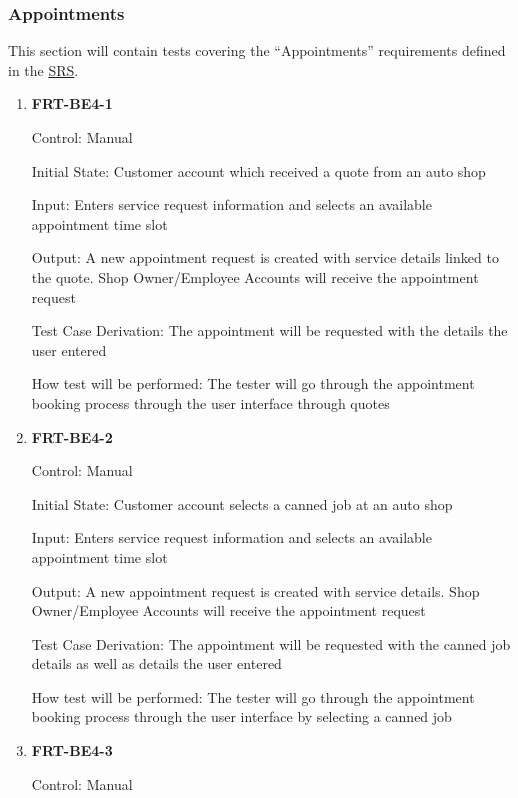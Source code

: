 \documentclass[12pt, titlepage]{article}
\begin{document}
\subsubsection{Appointments}

This section will contain tests covering the ``Appointments'' requirements defined in the
\href{https://github.com/arkinmodi/project-sayyara/blob/main/docs/SRS/SRS.pdf}{SRS}.

\begin{enumerate}

	\item \textbf{FRT-BE4-1}

	      Control: Manual

	      Initial State: Customer account which received a quote from an auto shop

	      Input: Enters service request information and selects an available appointment time slot

	      Output: A new appointment request is created with service details linked to the quote. Shop
	      Owner/Employee Accounts will receive the appointment request

	      Test Case Derivation: The appointment will be requested with the details the user entered

	      How test will be performed: The tester will go through the appointment booking process through the
	      user interface through quotes

	\item \textbf{FRT-BE4-2}

	      Control: Manual

	      Initial State: Customer account selects a canned job at an auto shop

	      Input: Enters service request information and selects an available appointment time slot

	      Output: A new appointment request is created with service details. Shop Owner/Employee Accounts
	      will receive the appointment request

	      Test Case Derivation: The appointment will be requested with the canned job details as well as
	      details the user entered

	      How test will be performed: The tester will go through the appointment booking process through the
	      user interface by selecting a canned job

	\item \textbf{FRT-BE4-3}

	      Control: Manual


\end{enumerate}
\end{document}
